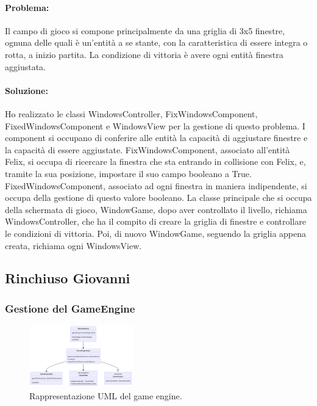 \documentclass[a4paper,12pt]{report}
\begin{document}
\paragraph{Problema:}
Il campo di gioco si compone principalmente da una griglia di 3x5 finestre, ognuna delle quali è un'entità a se stante, con la caratteristica di essere integra o rotta, a inizio partita.
La condizione di vittoria è avere ogni entità finestra aggiustata.

\paragraph{Soluzione:}

Ho realizzato le classi WindowsController, FixWindowsComponent, FixedWindowsComponent e WindowsView per la gestione di questo problema. 
I component  si occupano di conferire alle entità la capacità di aggiustare finestre e la capacità di essere aggiustate.
FixWindowsComponent, associato all'entità Felix, si occupa di ricercare la finestra che sta entrando in collisione con Felix, e, tramite la sua posizione, impostare il suo campo booleano a True.
FixedWindowsComponent, associato ad ogni finestra in maniera indipendente, si occupa della gestione di questo valore booleano.
La classe principale che si occupa della schermata di gioco, WindowGame, dopo aver controllato il livello, richiama WindowsController, che ha il compito di creare la griglia di finestre e controllare le condizioni di vittoria.
Poi, di nuovo WindowGame, seguendo la griglia appena creata, richiama ogni WindowsView.



\subsection{Rinchiuso Giovanni}

\subsubsection{Gestione del GameEngine}

\begin{figure}[H]
\centering{}
\includegraphics[width=0.4\textwidth]{img/GameEngine.png}
\caption{Rappresentazione UML del game engine.}
\end{figure}
\end{document}

